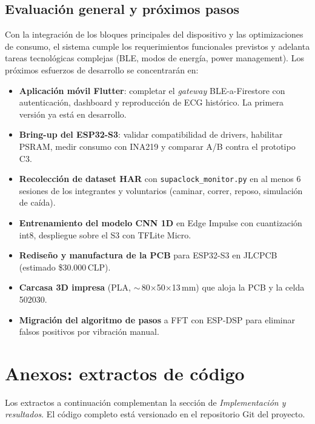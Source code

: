 \documentclass[letterpaper,11pt]{article}
\begin{document}
\subsection{Evaluación general y próximos pasos}
Con la integración de los bloques principales del dispositivo y las optimizaciones de consumo,
el sistema cumple los requerimientos funcionales previstos y adelanta tareas tecnológicas
complejas (BLE, modos de energía, power management). Los próximos esfuerzos de desarrollo se
concentrarán en:
\begin{itemize}
    \item \textbf{Aplicación móvil Flutter}: completar el \textit{gateway} BLE-a-Firestore
    con autenticación, dashboard y reproducción de ECG histórico. La primera versión ya está
    en desarrollo.
    \item \textbf{Bring-up del ESP32-S3}: validar compatibilidad de drivers, habilitar PSRAM,
    medir consumo con INA219 y comparar A/B contra el prototipo C3.
    \item \textbf{Recolección de dataset HAR} con \texttt{supaclock\_monitor.py} en al menos 6
    sesiones de los integrantes y voluntarios (caminar, correr, reposo, simulación de caída).
    \item \textbf{Entrenamiento del modelo CNN 1D} en Edge Impulse con cuantización int8,
    despliegue sobre el S3 con TFLite Micro.
    \item \textbf{Rediseño y manufactura de la PCB} para ESP32-S3 en JLCPCB
    (estimado \$30.000\,CLP).
    \item \textbf{Carcasa 3D impresa} (PLA, $\sim$\,80$\times$50$\times$13\,mm) que aloja la
    PCB y la celda 502030.
    \item \textbf{Migración del algoritmo de pasos} a FFT con ESP-DSP para eliminar falsos
    positivos por vibración manual.
\end{itemize}




\appendix
\section{Anexos: extractos de código}
Los extractos a continuación complementan la sección de \textit{Implementación y
resultados}. El código completo está versionado en el repositorio Git del proyecto.
\end{document}

